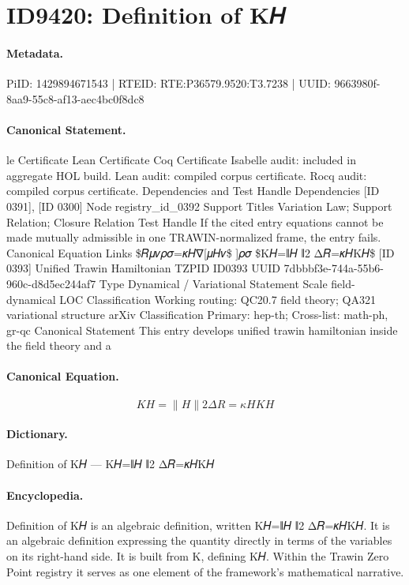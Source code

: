 \section*{ID9420: Definition of K𝐻}
\paragraph{Metadata.}
PiID: 1429894671543 | RTEID: RTE:P36579.9520:T3.7238 | UUID: 9663980f-8aa9-55c8-af13-aec4bc0f8dc8

\paragraph{Canonical Statement.}
le Certificate Lean Certificate Coq Certificate Isabelle audit: included in aggregate HOL build. Lean audit: compiled corpus certificate. Rocq audit: compiled corpus certificate. Dependencies and Test Handle Dependencies [ID 0391], [ID 0300] Node registry\_id\_0392 Support Titles Variation Law; Support Relation; Closure Relation Test Handle If the cited entry equations cannot be made mutually admissible in one TRAWIN-normalized frame, the entry fails. Canonical Equation Links \$𝑅𝜇𝜈𝜌𝜎=𝜅𝐻∇[𝜇𝐻𝜈\$ ]𝜌𝜎 \$K𝐻=∥𝐻 ∥2 Δ𝑅=𝜅𝐻K𝐻\$ [ID 0393] Unified Trawin Hamiltonian TZPID ID0393 UUID 7dbbbf3e-744a-55b6-960c-d8d5ec244af7 Type Dynamical / Variational Statement Scale field-dynamical LOC Classification Working routing: QC20.7 field theory; QA321 variational structure arXiv Classification Primary: hep-th; Cross-list: math-ph, gr-qc Canonical Statement This entry develops unified trawin hamiltonian inside the field theory and a

\paragraph{Canonical Equation.}
\[
K𝐻=∥𝐻 ∥2 Δ𝑅=𝜅𝐻K𝐻
\]

\paragraph{Dictionary.}
Definition of K𝐻 — K𝐻=∥𝐻 ∥2 Δ𝑅=𝜅𝐻K𝐻

\paragraph{Encyclopedia.}
Definition of K𝐻 is an algebraic definition, written K𝐻=∥𝐻 ∥2 Δ𝑅=𝜅𝐻K𝐻. It is an algebraic definition expressing the quantity directly in terms of the variables on its right-hand side. It is built from K, defining K𝐻. Within the Trawin Zero Point registry it serves as one element of the framework's mathematical narrative.
